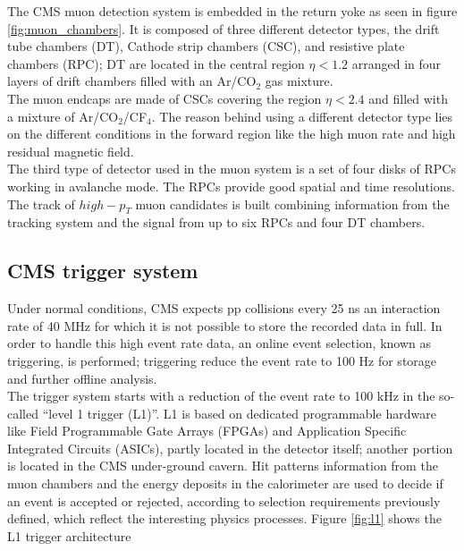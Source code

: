 \noindent The CMS muon detection system is embedded in the return yoke as seen in figure \ref{fig:muon_chambers}. It is composed of three different detector types, the drift tube chambers (DT), Cathode strip chambers (CSC), and resistive plate chambers (RPC); DT are located in the central region $\eta< 1.2$ arranged in four layers of drift chambers filled with an Ar/CO$_2$ gas mixture.\\

\noindent The muon endcaps are made of CSCs covering the region $\eta< 2.4$ and filled with a mixture of Ar/CO$_2$/CF$_4$. The reason behind using a different detector type lies on the different conditions in the forward region like the high muon rate and high residual magnetic field.\\

\noindent The third type of detector used in the muon system is a set of four disks of RPCs working in avalanche mode. The RPCs provide good spatial and time resolutions. The track of $high-p_T$ muon candidates is built combining information from the tracking system and the signal from up to six RPCs and four DT chambers.


\subsection{CMS trigger system}

\noindent Under normal conditions, CMS expects pp collisions every 25 ns \ie an interaction rate of 40 MHz for which it is not possible to store the recorded data in full. In order to handle this high event rate data, an online event selection, known as triggering, is performed; triggering reduce the event rate to 100 Hz for storage and further offline analysis.\\        

\noindent The trigger system starts with a reduction of the event rate to 100 kHz in the so-called ``level 1 trigger (L1)''. L1 is based on dedicated programmable hardware like Field Programmable Gate Arrays (FPGAs) and Application Specific Integrated Circuits (ASICs), partly located in the detector itself; another portion is located in the CMS under-ground cavern. Hit patterns information from the muon chambers and the energy deposits in the calorimeter are used to decide if an event is accepted or rejected, according to selection requirements previously defined, which reflect the interesting physics processes. Figure \ref{fig:l1} shows the L1 trigger architecture\\

